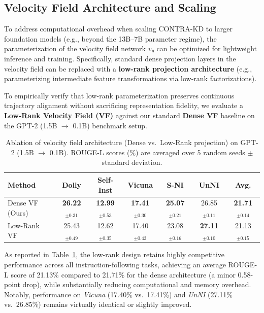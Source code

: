 \documentclass{article} %
\theoremstyle{definition}
\theoremstyle{remark}
\begin{document}
\subsection{Velocity Field Architecture and Scaling}
\label{sec:appendix_low_rank_vf}

To address computational overhead when scaling CONTRA-KD to larger foundation models (e.g., beyond the 13B--7B parameter regime), the parameterization of the velocity field network $v_\theta$ can be optimized for lightweight inference and training. Specifically, standard dense projection layers in the velocity field can be replaced with a \textbf{low-rank projection architecture} (e.g., parameterizing intermediate feature transformations via low-rank factorizations).

To empirically verify that low-rank parameterization preserves continuous trajectory alignment without sacrificing representation fidelity, we evaluate a \textbf{Low-Rank Velocity Field (VF)} against our standard \textbf{Dense VF} baseline on the GPT-2 (1.5B $\rightarrow$ 0.1B) benchmark setup.

\begin{table}[htbp]
\centering
\small
\setlength{\tabcolsep}{4.5pt}
\caption{Ablation of velocity field architecture (Dense vs.\ Low-Rank projection) on GPT-2 (1.5B $\rightarrow$ 0.1B). ROUGE-L scores (\%) are averaged over 5 random seeds $\pm$ standard deviation.}
\label{tab:low_rank_vf_ablation}
\begin{tabular}{lcccccc}
\toprule
\textbf{Method} & \textbf{Dolly} & \textbf{Self-Inst} & \textbf{Vicuna} & \textbf{S-NI} & \textbf{UnNI} & \textbf{Avg.} \\
\midrule
Dense VF (Ours) & \textbf{26.22}$_{\pm 0.31}$ & \textbf{12.99}$_{\pm 0.53}$ & \textbf{17.41}$_{\pm 0.30}$ & \textbf{25.07}$_{\pm 0.21}$ & 26.85$_{\pm 0.11}$          & \textbf{21.71}$_{\pm 0.14}$ \\
Low-Rank VF     & 25.43$_{\pm 0.49}$          & 12.62$_{\pm 0.35}$          & 17.40$_{\pm 0.43}$          & 23.08$_{\pm 0.16}$          & \textbf{27.11}$_{\pm 0.10}$ & 21.13$_{\pm 0.15}$          \\
\bottomrule
\end{tabular}
\end{table}

As reported in Table~\ref{tab:low_rank_vf_ablation}, the low-rank design retains highly competitive performance across all instruction-following tasks, achieving an average ROUGE-L score of 21.13\% compared to 21.71\% for the dense architecture (a minor 0.58-point drop), while substantially reducing computational and memory overhead. Notably, performance on \textit{Vicuna} (17.40\% vs.\ 17.41\%) and \textit{UnNI} (27.11\% vs.\ 26.85\%) remains virtually identical or slightly improved.
\end{document}
